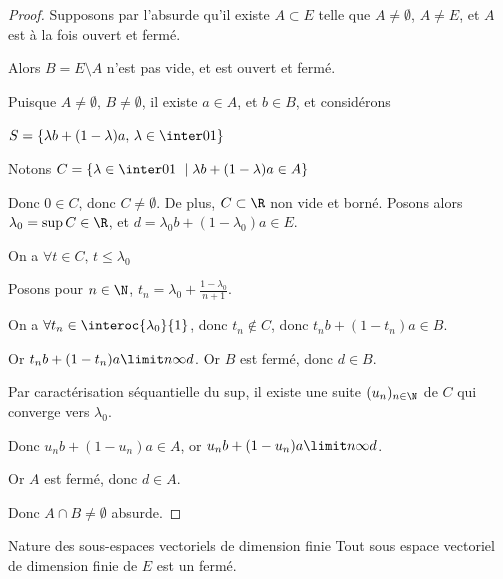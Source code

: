 
\begin{proof}
    Supposons par l'absurde qu'il existe $A \subset E$ telle que $A \neq \emptyset$, $A \neq E$, et $A$ est à la fois ouvert et fermé.

    Alors $B = E \setminus A$ n'est pas vide, et est ouvert et fermé. 

    Puisque $A \neq \emptyset, \, B \neq \emptyset$, il existe $a \in A$, et $b \in B$, 
    et considérons 
    
    $S = \left\{\lambda b + (1 - \lambda )a, \, \lambda \in \inter 0 1\right\}$

    Notons $C = \left\{\lambda \in \inter 0 1 \ \mid \lambda b + (1 - \lambda )a \in A\right\}$

    Donc $0 \in C$, donc $C \neq \emptyset$.
    De plus, $C \subset \R$ non vide et borné. Posons alors $\lambda_0 = \sup C \in \R$, et 
    $d = \lambda_0 b + (1 - \lambda_0)a \in E$.

    On a $\forall t \in C, \, t \leqslant \lambda_0$

    Posons pour $\displaystyle n \in \N$, $\displaystyle t_n = \lambda_0 + \frac{1 - \lambda_0}{n + 1}$. 

    On a $\forall t_n \in \interoc{\lambda_0}{1}$, donc $t_n \not \in C$, donc $t_n b + (1 - t_n)a \in B$.

    Or $t_n b + (1 - t_n)a \limit n \infty d$. Or $B$ est fermé, donc $d \in B$.

    Par caractérisation séquantielle du sup, il existe une suite $(u_n)_{n \in \N}$ de $C$ qui converge 
    vers $\lambda_0$.

    Donc $u_n b + (1 - u_n)a \in A$, or $u_n b + (1 - u_n)a \limit n \infty d$.

    Or $A$ est fermé, donc $d \in A$.

    Donc $A \cap B \neq \emptyset$ absurde.
\end{proof}

\begin{theoreme}{Nature des sous-espaces vectoriels de dimension finie}{}
    Tout sous espace vectoriel de dimension finie de $E$ est un fermé. 
\end{theoreme}


